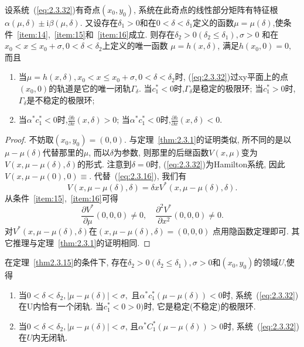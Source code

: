 \begin{theorem}
  \label{thm2.3.15}
  设系统~(\ref{eq:2.3.32})有奇点$(x_0,y_0)$,
  系统在此奇点的线性部分矩阵有特征根$\alpha(\mu, \delta) \pm \mathrm{i} \beta(\mu, \delta).$
  又设存在$\delta_1>0$和在$0<\delta<\delta_1$定义的函数$\mu=\mu(\delta)$,使条件~\ref{item:14},~\ref{item:15}和~\ref{item:16}成立.
  则存在$\delta_{2}>0\left(\delta_{2} \leqslant \delta_{1}\right), \sigma>0$
  和在
  $x_{0}<x \leqslant x_{0}+\sigma, 0<\delta<\delta_2$上定义的唯一函数
  $\mu=h(x,\delta)$,
  满足$h(x_0,0)=0,$
  而且
  \begin{enumerate}
  \item\label{item:18}
    当$\mu=h(x, \delta), x_{0}<x \leqslant x_{0}+\sigma, 0<\delta<\delta_{2}$时,
    (\ref{eq:2.3.32})过xy平面上的点$(x_{0},0)$的轨道是它的唯一闭轨$\Gamma_{\delta}$.
    当$c_1^{*}<0$时,$\Gamma_{\delta}$是稳定的极限环;
    当$c_{1}^{*}>0$时,$\Gamma_{\delta}$是不稳定的极限环;
  \item\label{item:19}
    当$\alpha^{*} c_{1}^{*}<0$时,$\frac{\partial h}{\partial x}(x, \delta)>0$;
    当$\alpha^{*} c_{1}^{*}<0$时,$\frac{\partial h}{\partial x}(x, \delta)<0$.
  \end{enumerate}
\end{theorem}

\begin{proof}
  不妨取$\left(x_{0}, y_{0}\right)=(0,0)$.
  与定理~\ref{thm:2.3.1}的证明类似,
  所不同的是以$\mu-\mu(\delta)$代替那里的$\mu$,
  而以$\delta$为参数,
  则那里的后继函数$V(x,\mu)$变为$V(x, \mu-\mu(\delta), \delta)$的形式.
  注意到$\delta=0$时,
  (\ref{eq:2.3.32})为Hamilton系统,
  因此$V(x, \mu-\mu(0), 0) \equiv $.
  代替~(\ref{eq:2.3.16}),
  我们有
  $$
V(x, \mu-\mu(\delta), \delta)=\delta x V^{*}(x, \mu-\mu(\delta), \delta).
$$
从条件~\ref{item:15},~\ref{item:16}可得
$$
\frac{\partial V^{*}}{\partial \mu}(0,0,0) \neq 0, \quad \frac{\partial^{2} V^{*}}{\partial x^{2}}(0,0,0) \neq 0.
$$
对$V^{*}(x, \mu-\mu(\delta), \delta)$在$(x, \mu-\mu(\delta), \delta)=(0,0,0)$
点用隐函数定理即可.
其它推理与定理~\ref{thm:2.3.1}的证明相同.
\end{proof}

\begin{collory}
  \label{col2.3.16}
  在定理~\ref{thm2.3.15}的条件下,
  存在$\delta_{2}>0\left(\delta_{2} \leqslant \delta_{1}\right), \sigma>0$和$(x_{0},y_{0})$的领域$U$,使得
  \begin{enumerate}
  \item\label{item:20}
    当$0<\delta<\delta_{2},|\mu-\mu(\delta)|<\sigma,$
    且$\alpha^{*} c_{1}^{*}(\mu-\mu(\delta))<0$时,
    系统~(\ref{eq:2.3.32})在U内恰有一个闭轨.
    当$c_{1}^{*}<0>0 )$时,
    它是稳定(不稳定)的极限环.
  \item\label{item:21}
    当$0<\delta<\delta_{2},|\mu-\mu(\delta)|<\sigma$,
    且$\alpha^{*} C_{1}^{*}(\mu-\mu(\delta))>0$时,
    系统~(\ref{eq:2.3.32})在$U$内无闭轨.
  \end{enumerate}
\end{collory}

